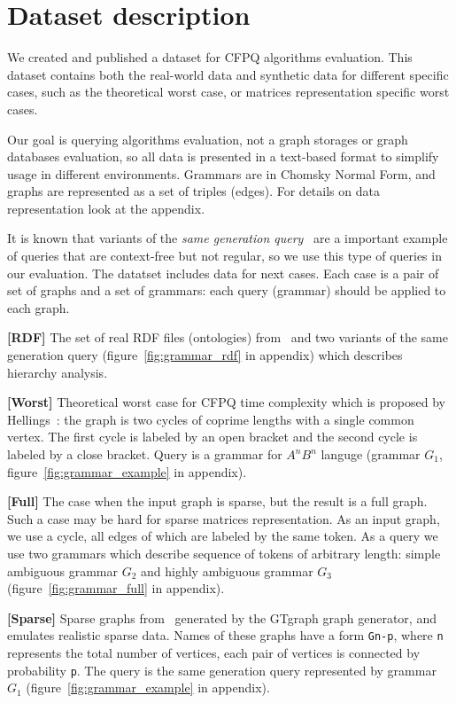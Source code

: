 \section{Dataset description}

We created and published a dataset for CFPQ algorithms evaluation.
This dataset contains both the real-world data and synthetic data for different specific cases, such as the theoretical worst case, or matrices representation specific worst cases.

Our goal is querying algorithms evaluation, not a graph storages or graph databases evaluation, so all data is presented in a text-based format to simplify usage in different environments.
Grammars are in Chomsky Normal Form, and graphs are represented as a set of triples (edges).
For details on data representation look at the appendix.

It is known that variants of the \textit{same generation query}~\cite{FndDB} are a important example of queries that are context-free but not regular, so we use this type of queries in our evaluation.
The datatset includes data for next cases.
Each case is a pair of set of graphs and a set of grammars: each query (grammar) should be applied to each graph.

\textbf{[RDF]} The set of real RDF files (ontologies) from~\cite{RDF} and two variants of the same generation query (figure~\ref{fig:grammar_rdf} in appendix) which describes hierarchy analysis.

\textbf{[Worst]} Theoretical worst case for CFPQ time complexity which is proposed by Hellings~\cite{hellingsPathQuerying}: the graph is two cycles of coprime lengths with a single common vertex.
The first cycle is labeled by an open bracket and the second cycle is labeled by a close bracket.
Query is a grammar for $A^nB^n$ languge (grammar $G_1$, figure~\ref{fig:grammar_example} in appendix).

\textbf{[Full]} The case when the input graph is sparse, but the result is a full graph.
Such a case may be hard for sparse matrices representation.
As an input graph, we use a cycle, all edges of which are labeled by the same token.
As a query we use two grammars which describe sequence of tokens of arbitrary length: simple ambiguous grammar $G_2$  and highly ambiguous grammar $G_3$ (figure~\ref{fig:grammar_full} in appendix).

\textbf{[Sparse]} Sparse graphs from~\cite{fan2018scaling} generated by the GTgraph graph generator, and emulates realistic sparse data.
Names of these graphs have a form \texttt{Gn-p}, where \texttt{n} represents the total number of vertices, each pair of vertices is connected by probability \texttt{p}.
The query is the same generation query represented by grammar $G_1$ (figure~\ref{fig:grammar_example} in appendix).

